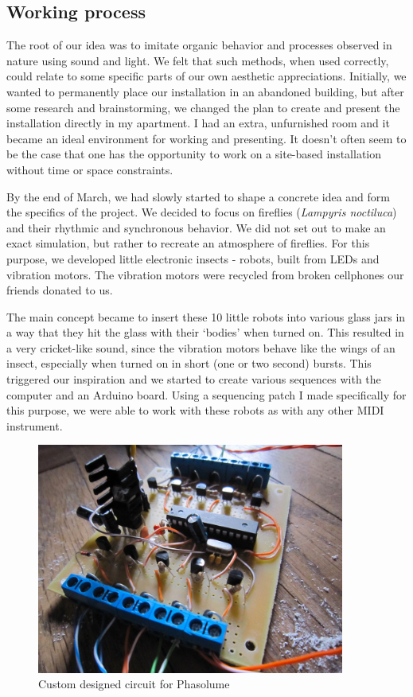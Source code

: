 \documentclass[12pt,a4paper,oneside]{report}
\begin{document}
\subsection{Working process} 

The root of our idea was to imitate organic behavior and processes observed in nature using sound and light.  We felt that such methods, when used correctly, could relate to some specific parts of our own aesthetic appreciations. Initially, we wanted to permanently place our installation in an abandoned building, but after some research and brainstorming, we changed the plan to create and present the installation directly in my apartment. I had an extra, unfurnished room and it became an ideal environment for working and presenting.  It doesn't often seem to be the case that one has the opportunity to work on a site-based installation without time or space constraints.

By the end of March, we had slowly started to shape a concrete idea and form the specifics of the project. We decided to focus on fireflies (\emph{Lampyris noctiluca}) and their rhythmic and synchronous behavior. We did not set out to make an exact simulation, but rather to recreate an atmosphere of fireflies.  For this purpose, we developed little electronic insects - robots, built from LEDs and vibration motors. The vibration motors were recycled from broken cellphones our friends donated to us.

The main concept became to insert these 10 little robots into various glass jars in a way that they hit the glass with their `bodies' when turned on. This resulted in a very cricket-like sound, since the vibration motors behave like the wings of an insect, especially when turned on in short (one or two second) bursts. This triggered our inspiration and we started to create various sequences with the computer and an Arduino board. Using a sequencing patch I made specifically for this purpose, we were able to work with these robots as with any other MIDI instrument.

\begin{figure}  
  \centering
    \includegraphics[width=0.9\textwidth]{img/phasolume}
        \caption{Custom designed circuit for Phasolume}
        \label{fig:phasolume}
\end{figure}
\end{document}
